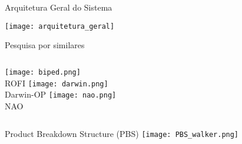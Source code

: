 \begin{frame}[t]{Arquitetura Geral do Sistema} 

    \centering
    \texttt{[image: arquitetura\_geral]}

\end{frame}


\begin{frame}[t]{Pesquisa por similares}
\begin{columns}
        \centering    
            \newline \newline 
            \hspace{1.5cm}\texttt{[image: biped.png]}
                \\ ROFI 
        \centering
            \texttt{[image: darwin.png]}
            \\ Darwin-OP 
        \centering
            \texttt{[image: nao.png]}
            \\ NAO
\end{columns}
\end{frame}


\begin{frame}[t]{Product Breakdown Structure (PBS)} 
\centering
\vspace{1cm}
\texttt{[image: PBS\_walker.png]}
\end{frame}


